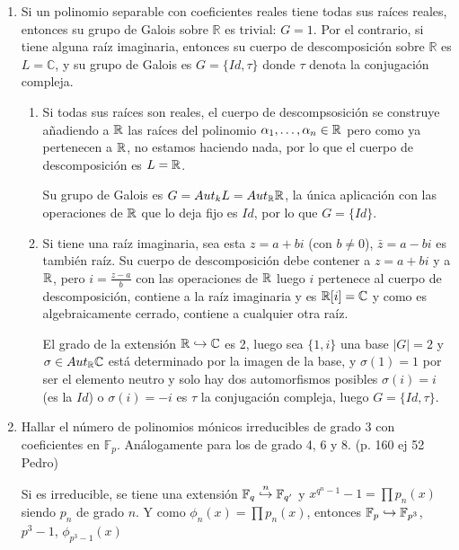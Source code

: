 \begin{enumerate}
    \item Si un polinomio separable con coeficientes reales tiene todas sus raíces reales, entonces su grupo de Galois sobre $\mathbb{R}$ es trivial: $G=1$. Por el contrario, si tiene alguna raíz imaginaria, entonces su cuerpo de descomposición sobre $\mathbb{R}$ es $L=\mathbb{C}$, y su grupo de Galois es $G=\{Id, \tau\}$ donde $\tau$ denota la conjugación compleja.
    \begin{dem}
        \begin{enumerate}
            \item Si todas sus ra\'ices son reales, el cuerpo de descompsosici\'on se construye añadiendo a $\mathbb{R}$ las ra\'ices del polinomio $\alpha_1, \ldots, \alpha_n \in \mathbb{R}$ pero como ya pertenecen a $\mathbb{R}$, no estamos haciendo nada, por lo que el cuerpo de descomposici\'on es $L = \mathbb{R}$. 
            
            Su grupo de Galois es $G = Aut_{k} L = Aut_{\mathbb{R}} \mathbb{R}$, la \'unica aplicaci\'on con las operaciones de $\mathbb{R}$ que lo deja fijo es $Id$, por lo que $G=\{Id\}$. 

            \item Si tiene una ra\'iz imaginaria, sea esta $z=a+bi$ (con $b\neq 0$), $\bar z = a-bi$ es tambi\'en ra\'iz. Su cuerpo de descomposici\'on debe contener a $z=a+bi$ y a $\mathbb{R}$, pero $i = \frac{z-a}{b}$ con las operaciones de $\mathbb{R}$ luego $i$ pertenece al cuerpo de descomposici\'on, contiene a la ra\'iz imaginaria y es $\mathbb{R} [i] = \mathbb{C}$ y como es algebraicamente cerrado, contiene a cualquier otra ra\'iz.
            
            El grado de la extensi\'on $\mathbb{R} \hookrightarrow \mathbb{C}$ es 2, luego sea $\{1,i\}$ una base $|G|=2$ y $\sigma \in Aut_{\mathbb{R}} \mathbb{C}$ est\'a determinado por la imagen de la base, y $\sigma(1)=1$ por ser el elemento neutro y solo hay dos automorfismos posibles $\sigma(i) = i$ (es la $Id$) o $\sigma(i)=-i$ es $\tau$ la conjugaci\'on compleja, luego $G = \{Id, \tau\}$.
        \end{enumerate}
    \end{dem}
    \item Hallar el número de polinomios mónicos irreducibles de grado 3 con coeficientes en $\mathbb{F}_{p}$. Análogamente para los de grado 4, 6 y 8. (p. 160 ej 52 Pedro)
    \begin{dem}
        Si es irreducible, se tiene una extensi\'on $\mathbb{F}_q \overset{n}{\hookrightarrow} \mathbb{F}_{q'}$ y $x^{q^n-1}-1 = \prod p_n(x)$ siendo $p_n$ de grado $n$. Y como $\phi_n(x) = \prod p_n(x)$, entonces $\mathbb{F}_p \hookrightarrow \mathbb{F}_{p^3}$, $p^3-1$, $\phi_{p^3-1}(x)$


\end{dem}
\end{enumerate}
